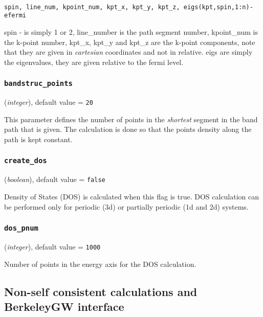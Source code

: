 \documentclass{article}
\begin{document}
\begin{verbatim}

spin, line_num, kpoint_num, kpt_x, kpt_y, kpt_z, eigs(kpt,spin,1:n)-efermi

\end{verbatim}

spin - is simply 1 or 2, line\_number is the path segment number, kpoint\_num
is the k-point number, kpt\_x, kpt\_y and kpt\_z are the k-point components,
note that they are given in {\it cartesian} coordinates and not in relative. 
eigs are simply the eigenvalues, they are given relative to the fermi level. 

\subsubsection{\tt bandstruc\_points
\label{BandstrucPoints}}
({\it integer}),
default value = {\tt 20 }

This parameter defines the number of points in the {\it shortest} segment
in the band path that is given. The calculation is done so that the points
density along the path is kept constant.  

\subsubsection{\tt create\_dos
\label{CreateDos}}
({\it boolean}),
default value = {\tt false}

Density of States (DOS) is calculated when this flag is true. DOS calculation
can be performed only for periodic (3d) or partially periodic (1d and 2d) 
systems.

\subsubsection{\tt dos\_pnum
\label{DosPnum}}
({\it integer}),
default value = {\tt 1000}

Number of points in the energy axis for the DOS calculation. 


  





\subsection{Non-self consistent calculations and BerkeleyGW interface}
\end{document}
